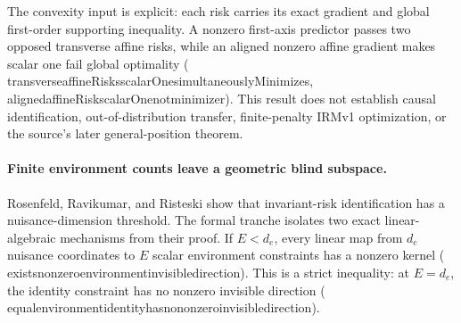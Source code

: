 \documentclass[11pt]{article}
\newcommand{\leanname}[1]{{\scriptsize\ttfamily
  \def\_{\textunderscore\allowbreak}#1}}
\begin{document}
The convexity input is explicit: each risk carries its exact gradient and
global first-order supporting inequality.  A nonzero first-axis predictor
passes two opposed transverse affine risks, while an aligned nonzero affine
gradient makes scalar one fail global optimality
(\leanname{transverse\_affineRisks\_scalarOne\_simultaneouslyMinimizes},
\leanname{aligned\_affineRisk\_scalarOne\_not\_minimizer}).
This result does not establish causal identification, out-of-distribution
transfer, finite-penalty IRMv1 optimization, or the source's later
general-position theorem.

\paragraph{Finite environment counts leave a geometric blind subspace.}
Rosenfeld, Ravikumar, and Risteski
\cite{rosenfeld2020risks} show that invariant-risk identification has a
nuisance-dimension threshold.  The formal tranche isolates two exact
linear-algebraic mechanisms from their proof.  If $E<d_e$, every linear map
from $d_e$ nuisance coordinates to $E$ scalar environment constraints has a
nonzero kernel
(\leanname{exists\_nonzero\_environment\_invisible\_direction}).
This is a strict inequality: at $E=d_e$, the identity constraint has no
nonzero invisible direction
(\leanname{equal\_environment\_identity\_has\_no\_nonzero\_invisible\_direction}).
\end{document}
